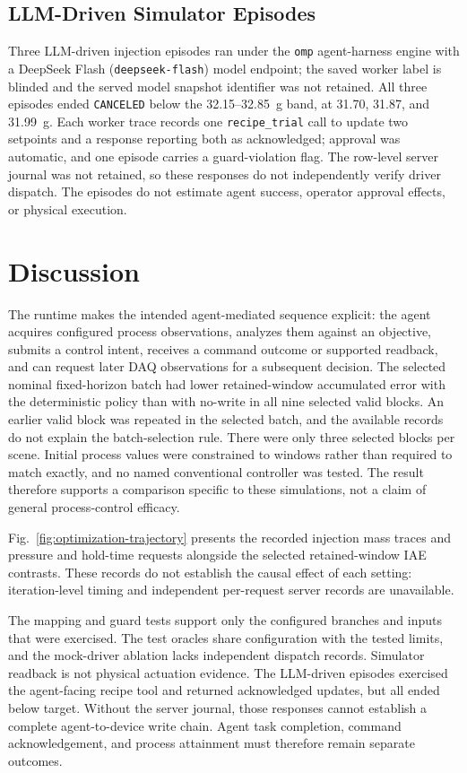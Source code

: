 \documentclass[journal]{IEEEtran}
\begin{document}
\subsection{LLM-Driven Simulator Episodes}
\label{sec:eval-agent}
Three LLM-driven injection episodes ran under the \texttt{omp} agent-harness engine with a DeepSeek Flash (\texttt{deepseek-flash}) model endpoint; the saved worker label is blinded and the served model snapshot identifier was not retained. All three episodes ended \texttt{CANCELED} below the 32.15--32.85~g band, at 31.70, 31.87, and 31.99~g. Each worker trace records one \texttt{recipe\_trial} call to update two setpoints and a response reporting both as acknowledged; approval was automatic, and one episode carries a guard-violation flag. The row-level server journal was not retained, so these responses do not independently verify driver dispatch. The episodes do not estimate agent success, operator approval effects, or physical execution.

 \section{Discussion}
\label{sec:discussion}
The runtime makes the intended agent-mediated sequence explicit: the agent acquires configured process observations, analyzes them against an objective, submits a control intent, receives a command outcome or supported readback, and can request later DAQ observations for a subsequent decision. The selected nominal fixed-horizon batch had lower retained-window accumulated error with the deterministic policy than with no-write in all nine selected valid blocks. An earlier valid block was repeated in the selected batch, and the available records do not explain the batch-selection rule. There were only three selected blocks per scene. Initial process values were constrained to windows rather than required to match exactly, and no named conventional controller was tested. The result therefore supports a comparison specific to these simulations, not a claim of general process-control efficacy.

Fig.~\ref{fig:optimization-trajectory} presents the recorded injection mass traces and pressure and hold-time requests alongside the selected retained-window IAE contrasts. These records do not establish the causal effect of each setting: iteration-level timing and independent per-request server records are unavailable.

The mapping and guard tests support only the configured branches and inputs that were exercised. The test oracles share configuration with the tested limits, and the mock-driver ablation lacks independent dispatch records. Simulator readback is not physical actuation evidence. The LLM-driven episodes exercised the agent-facing recipe tool and returned acknowledged updates, but all ended below target. Without the server journal, those responses cannot establish a complete agent-to-device write chain. Agent task completion, command acknowledgement, and process attainment must therefore remain separate outcomes.
\end{document}
